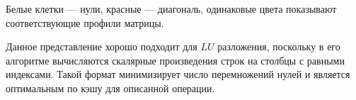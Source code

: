 \documentclass[russian, english]{article}
\begin{document}
\newcommand*{\GridSize}{8}

\newcommand*{\ColorCells}[1]{%
	\foreach \x/\y/\color in {#1} {
		\node [fill=\color, draw=none, thick, minimum size=1cm] 
			at (\x-.5,\GridSize+0.5-\y) {};
	}
}

\newcommand*{\ColorCellsdxdy}[4]{%
	\foreach \myi in {1,...,#1}{
		\foreach \x/\y/\color in {#4} {
			\node [fill=\color, draw=none, thick, minimum size=1cm] 
				at (\myi*#2-#2+\x-.5,\myi*#3-#3+\GridSize+0.5-\y) {};
		}
	}
}
\begin{center}
\end{center}
Белые клетки --- нули, красные --- диагональ, одинаковые цвета показывают соответствующие профили матрицы.\par
Данное представление хорошо подходит для $LU$ разложения, поскольку в его алгоритме вычисляются скалярные произведения строк на столбцы с равными индексами. Такой формат минимизирует число перемножений нулей и является оптимальным по кэшу для описанной операции.
\end{document}
